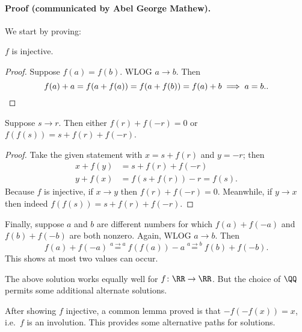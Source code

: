 \paragraph{Proof (communicated by Abel George Mathew).}
We start by proving:
\begin{claim*}
  $f$ is injective.
\end{claim*}
\begin{proof}
  Suppose $f(a) = f(b)$. WLOG $a \to b$. Then
  \[ f(a)+a = f(a+f(a)) = f(a+f(b)) = f(a)+b \implies a=b. \qedhere. \]
\end{proof}

\begin{claim*}
  Suppose $s \to r$.
  Then either $f(r) + f(-r) = 0$ or $f(f(s)) = s+f(r)+f(-r)$.
\end{claim*}
\begin{proof}
  Take the given statement with $x = s+f(r)$ and $y = -r$; then
  \begin{align*}
    x + f(y) &= s + f(r) + f(-r) \\
    y + f(x) &= f(s+f(r)) - r = f(s).
  \end{align*}
  Because $f$ is injective, if $x \to y$ then $f(r) + f(-r) = 0$.
  Meanwhile, if $y \to x$ then indeed $f(f(s)) = s + f(r) + f(-r)$.
\end{proof}

Finally, suppose $a$ and $b$ are different numbers for which
$f(a)+f(-a)$ and $f(b)+f(-b)$ are both nonzero.
Again, WLOG $a \to b$.
Then
\[ f(a) + f(-a) \overset{a \to a}{=} f(f(a))-a \overset{a \to b}{=} f(b) + f(-b). \]
This shows at most two values can occur.

\begin{remark*}
  The above solution works equally well for $f \colon \RR \to \RR$.
  But the choice of $\QQ$ permits some additional alternate solutions.
\end{remark*}

\begin{remark*}
  After showing $f$ injective,
  a common lemma proved is that $-f(-f(x)) = x$, i.e.\ $f$ is an involution.
  This provides some alternative paths for solutions.
\end{remark*}
\pagebreak




